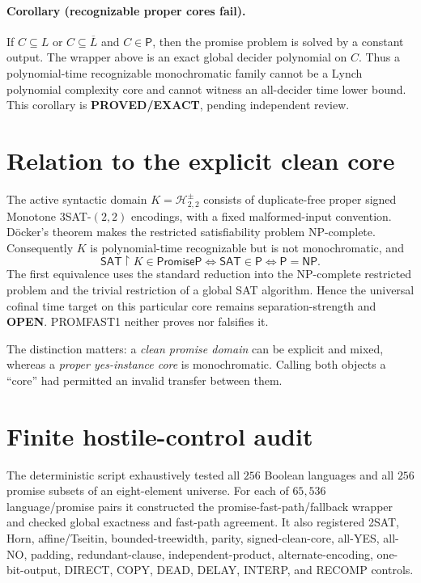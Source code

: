\documentclass[11pt]{article}
\newcommand{\Pclass}{\mathsf P}
\newcommand{\NPclass}{\mathsf{NP}}
\newcommand{\PromiseP}{\mathsf{PromiseP}}
\newcommand{\OPEN}{\textbf{OPEN}}
\newcommand{\EXACT}{\textbf{PROVED/EXACT}}
\begin{document}
\paragraph{Corollary (recognizable proper cores fail).}
If $C\subseteq L$ or $C\subseteq\overline L$ and $C\in\Pclass$, then
the promise problem is solved by a constant output.  The wrapper above is an
exact global decider polynomial on $C$.  Thus a polynomial-time recognizable
monochromatic family cannot be a Lynch polynomial complexity core and cannot
witness an all-decider time lower bound.  This corollary is \EXACT, pending
independent review.

\section{Relation to the explicit clean core}
The active syntactic domain $K=\mathcal H^{\pm}_{2,2}$ consists of
duplicate-free proper signed Monotone $3$SAT-$(2,2)$ encodings, with a
fixed malformed-input convention.  D\"ocker's theorem makes the restricted
satisfiability problem NP-complete.  Consequently $K$ is polynomial-time
recognizable but is not monochromatic, and
\[
 \mathsf{SAT}\upharpoonright K\in\PromiseP
 \iff \mathsf{SAT}\in\Pclass
 \iff \Pclass=\NPclass .
\]
The first equivalence uses the standard reduction into the NP-complete
restricted problem and the trivial restriction of a global SAT algorithm.
Hence the universal cofinal time target on this particular core remains
separation-strength and \OPEN.  PROMFAST1 neither proves nor falsifies it.

The distinction matters: a \emph{clean promise domain} can be explicit and
mixed, whereas a \emph{proper yes-instance core} is monochromatic.  Calling
both objects a ``core'' had permitted an invalid transfer between them.

\section{Finite hostile-control audit}
The deterministic script
 exhaustively tested
all $256$ Boolean languages and all $256$ promise subsets of an
eight-element universe.  For each of $65{,}536$ language/promise pairs it
constructed the promise-fast-path/fallback wrapper and checked global exactness
and fast-path agreement.  It also registered 2SAT, Horn, affine/Tseitin,
bounded-treewidth, parity, signed-clean-core, all-YES, all-NO, padding,
redundant-clause, independent-product, alternate-encoding, one-bit-output,
DIRECT, COPY, DEAD, DELAY, INTERP, and RECOMP controls.
\end{document}
